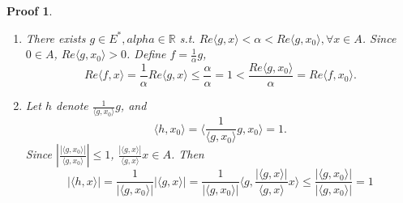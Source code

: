\documentclass[hyperref,UTF8]{ctexart}
\newtheorem{pf}{Proof}[section]
\begin{document}
\begin{pf}
\begin{enumerate}
    \item There exists $g\in E^*, alpha\in \mathbb R$ s.t. $Re\langle g, x\rangle < \alpha < Re \langle g, x_0\rangle, \forall x\in A$. Since $0 \in A$, $Re\langle g, x_0\rangle > 0$. Define $f = \frac1\alpha g$, 
    \[Re\langle f, x\rangle = \frac1\alpha Re \langle g, x\rangle \leq \frac\alpha\alpha = 1< \frac{Re\langle g, x_0\rangle}{\alpha} = Re\langle f, x_0\rangle.\]
    \item Let $h$ denote $\frac1{\langle g, x_0\rangle} g$, and
    \[\langle h, x_0\rangle = \langle\frac{1}{\langle g, x_0\rangle}g, x_0\rangle = 1.\]
    Since $\left|\frac{|\langle g, x_0\rangle|}{\langle g, x_0\rangle}\right|\leq 1$, $\frac{|\langle g, x\rangle|}{\langle g, x\rangle}x\in A$. Then
    \[|\langle h, x\rangle| = \frac1{|\langle g, x_0\rangle|}|\langle g, x\rangle| = \frac1{|\langle g, x_0\rangle|}\langle g, \frac{|\langle g, x\rangle|}{\langle g, x\rangle}x\rangle\leq \frac{|\langle g, x_0\rangle|}{|\langle g, x_0\rangle|} = 1\]
\end{enumerate}
\end{pf}
\end{document}
